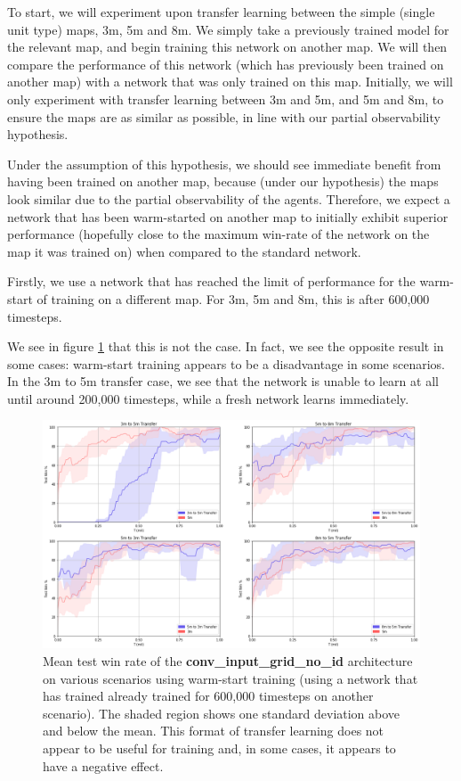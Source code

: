 To start, we will experiment upon transfer learning between the simple (single unit type) maps, 3m, 5m and 8m. We simply take a previously trained model for the relevant map, and begin training this network on another map. We will then compare the performance of this network (which has previously been trained on another map) with a network that was only trained on this map. Initially, we will only experiment with transfer learning between 3m and 5m, and 5m and 8m, to ensure the maps are as similar as possible, in line with our partial observability hypothesis.

Under the assumption of this hypothesis, we should see immediate benefit from having been trained on another map, because (under our hypothesis) the maps look similar due to the partial observability of the agents. Therefore, we expect a network that has been warm-started on another map to initially exhibit superior performance (hopefully close to the maximum win-rate of the network on the map it was trained on) when compared to the standard network.


Firstly, we use a network that has reached the limit of performance for the warm-start of training on a different map. For 3m, 5m and 8m, this is after 600,000 timesteps.


We see in figure \ref{fig:transfer6} that this is not the case. In fact, we see the opposite result in some cases: warm-start training appears to be a disadvantage in some scenarios. In the 3m to 5m transfer case, we see that the network is unable to learn at all until around 200,000 timesteps, while a fresh network learns immediately.

\begin{figure}[h]
    \centering
    \hbox{\hspace{-5em}\includegraphics[width=1.2\textwidth]{images/graphs/6.png}}
    \caption{Mean test win rate of the \textbf{conv\_input\_grid\_no\_id} architecture on various scenarios using warm-start training (using a network that has trained already trained for 600,000 timesteps on another scenario). The shaded region shows one standard deviation above and below the mean. This format of transfer learning does not appear to be useful for training and, in some cases, it appears to have a negative effect. }
    \label{fig:transfer6}
\end{figure}


